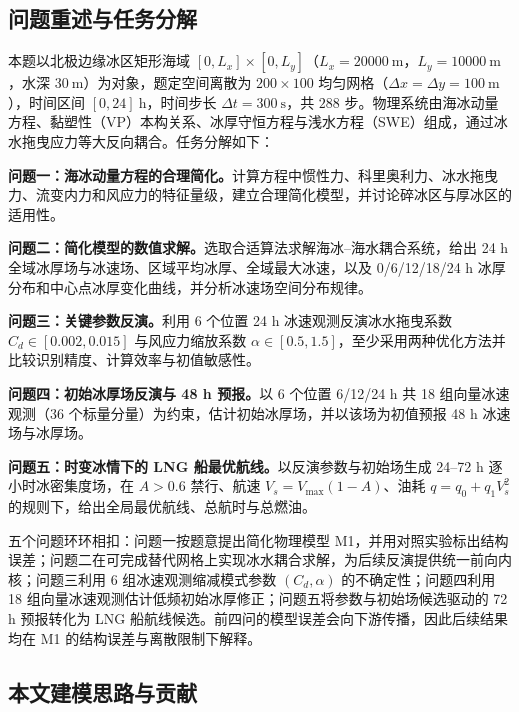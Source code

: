 \documentclass[UTF8]{ctexart}
\begin{document}
\subsection{问题重述与任务分解}

本题以北极边缘冰区矩形海域 $[0,L_x]\times[0,L_y]$（$L_x=20000\ \mathrm m$，$L_y=10000\ \mathrm m$，水深 $30\ \mathrm m$）为对象，题定空间离散为 $200\times100$ 均匀网格（$\Delta x=\Delta y=100\ \mathrm m$），时间区间 $[0,24]\ \mathrm h$，时间步长 $\Delta t=300\ \mathrm s$，共 $288$ 步。物理系统由海冰动量方程、黏塑性（VP）本构关系、冰厚守恒方程与浅水方程（SWE）组成，通过冰水拖曳应力等大反向耦合。任务分解如下：

\par \textbf{问题一：海冰动量方程的合理简化。}计算方程中惯性力、科里奥利力、冰水拖曳力、流变内力和风应力的特征量级，建立合理简化模型，并讨论碎冰区与厚冰区的适用性。

\par \textbf{问题二：简化模型的数值求解。}选取合适算法求解海冰--海水耦合系统，给出 24 h 全域冰厚场与冰速场、区域平均冰厚、全域最大冰速，以及 0/6/12/18/24 h 冰厚分布和中心点冰厚变化曲线，并分析冰速场空间分布规律。

\par \textbf{问题三：关键参数反演。}利用 6 个位置 24 h 冰速观测反演冰水拖曳系数 $C_d\in[0.002,0.015]$ 与风应力缩放系数 $\alpha\in[0.5,1.5]$，至少采用两种优化方法并比较识别精度、计算效率与初值敏感性。

\par \textbf{问题四：初始冰厚场反演与 48 h 预报。}以 6 个位置 6/12/24 h 共 18 组向量冰速观测（36 个标量分量）为约束，估计初始冰厚场，并以该场为初值预报 48 h 冰速场与冰厚场。

\par \textbf{问题五：时变冰情下的 LNG 船最优航线。}以反演参数与初始场生成 24--72 h 逐小时冰密集度场，在 $A>0.6$ 禁行、航速 $V_s=V_{\max}(1-A)$、油耗 $q=q_0+q_1V_s^2$ 的规则下，给出全局最优航线、总航时与总燃油。

\par 五个问题环环相扣：问题一按题意提出简化物理模型 M1，并用对照实验标出结构误差；问题二在可完成替代网格上实现冰水耦合求解，为后续反演提供统一前向内核；问题三利用 6 组冰速观测缩减模式参数 $(C_d,\alpha)$ 的不确定性；问题四利用 18 组向量冰速观测估计低频初始冰厚修正；问题五将参数与初始场候选驱动的 72 h 预报转化为 LNG 船航线候选。前四问的模型误差会向下游传播，因此后续结果均在 M1 的结构误差与离散限制下解释。

\subsection{本文建模思路与贡献}
\end{document}
